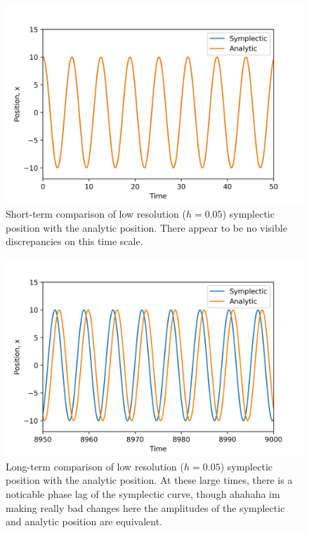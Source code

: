 \documentclass{article}
\begin{document}
\begin{figure}[H]
\includegraphics[width=\textwidth]{offset1.jpg}
\caption{Short-term comparison of low resolution ($h=0.05$) symplectic position with the analytic position. There appear to be no visible discrepancies on this time scale.}
\end{figure}

\begin{figure}[H]
\includegraphics[width=\textwidth]{offset2.jpg}
\caption{Long-term comparison of low resolution ($h=0.05$) symplectic position with the analytic position. At these large times, there is a noticable phase lag of the symplectic curve, though ahahaha im making really bad changes here the amplitudes of the symplectic and analytic position are equivalent.}
\end{figure}
\end{document}
